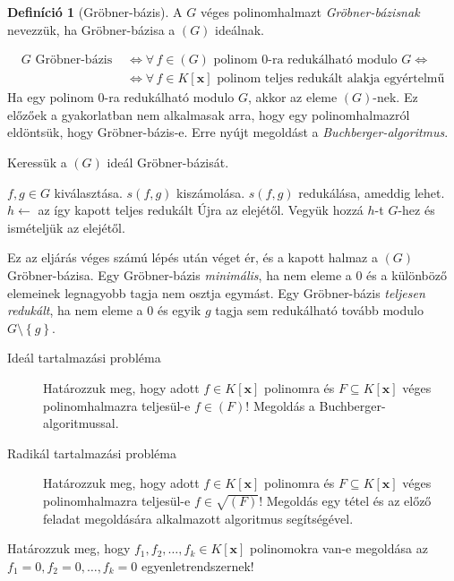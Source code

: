 \documentclass[DIV=15,appendixprefix]{scrreprt}
\theoremstyle{definition}
\newtheorem*{defin}{Definíció}
\theoremstyle{remark}
\begin{document}
\begin{defin}[Gröbner-bázis]
	A $ G $ véges polinomhalmazt \emph{Gröbner-bázisnak} nevezzük, ha Gröbner-bázisa a $ \left( G
	\right) $ ideálnak.
\end{defin}
\begin{equation*}
	\begin{split}
		G \text{ Gröbner-bázis } &\Leftrightarrow \forall \, f \in \left( G \right) \text{ polinom
		0-ra redukálható modulo } G \Leftrightarrow\\
		&\Leftrightarrow \forall \, f\in K \left[ \mathbf{ x } \right]
		\text{ polinom teljes redukált alakja egyértelmű}
	\end{split}
\end{equation*}
Ha egy polinom 0-ra redukálható modulo $ G $, akkor az eleme $ \left( G \right) $-nek.
%
Ez előzőek a gyakorlatban nem alkalmasak arra, hogy egy polinomhalmazról eldöntsük, hogy
Gröbner-bázis-e. Erre nyújt megoldást a \emph{Buchberger-algoritmus}.

Keressük a $ \left( G \right) $ ideál Gröbner-bázisát.
\begin{algorithmic}[1]
	\State $ f,{} g \in G $ kiválasztása.
	\State $ s \left( f,{} g \right) $ kiszámolása.
	\State $ s \left( f,{} g \right) $  redukálása, ameddig lehet.
	\State $ h  \gets$ az így kapott teljes redukált
		\State Újra az elejétől.
	\Else
		\State Vegyük hozzá $ h $-t $ G $-hez és ismételjük az elejétől.
	\EndIf
\end{algorithmic}
Ez az eljárás véges számú lépés után véget ér, és a kapott halmaz a $ \left( G \right) $
Gröbner-bázisa.
Egy Gröbner-bázis \emph{minimális}, ha nem eleme a 0 és a különböző elemeinek legnagyobb tagja nem
osztja egymást. Egy Gröbner-bázis \emph{teljesen redukált}, ha nem eleme a 0 és egyik $ g $ tagja
sem redukálható tovább modulo $ G \setminus \left\{ g \right\}$.
\begin{description}
	\item[Ideál tartalmazási probléma] Határozzuk meg, hogy adott $ f \in K \left[ \mathbf{ x }
		\right] $ polinomra és $ F \subseteq K \left[ \mathbf{ x } \right] $ véges polinomhalmazra
		teljesül-e $ f \in \left( F \right) $! Megoldás a Buchberger-algoritmussal.
	\item[Radikál tartalmazási probléma] Határozzuk meg, hogy adott $ f \in  K \left[ \mathbf{ x }
		\right]$ polinomra és $ F \subseteq K \left[ \mathbf{ x } \right] $ véges polinomhalmazra
		teljesül-e $ f \in \sqrt{ \left( F \right) }$! Megoldás egy tétel és az előző feladat
		megoldására alkalmazott algoritmus segítségével.
\end{description}
%
Határozzuk meg, hogy $ f_{ 1 },{} f_{ 2 },{} \ldots,{} f_{ k } \in K \left[ \mathbf{ x } \right] $
polinomokra van-e megoldása az $ f_{ 1 } = 0,{} f_{ 2 } = 0,{} \ldots,{} f_{ k } = 0 $
egyenletrendszernek!
\end{document}

